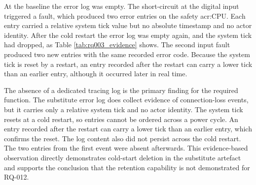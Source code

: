 At the baseline the error log was empty. The short-circuit at the digital input triggered a fault, which produced two error entries on the safety \gls{acr:CPU}. Each entry carried a relative system tick value but no absolute timestamp and no actor identity. After the cold restart the error log was empty again, and the system tick had dropped, as Table \ref{tab:rq003_evidence} shows. The second input fault produced two new entries with the same recorded error code. Because the system tick is reset by a restart, an entry recorded after the restart can carry a lower tick than an earlier entry, although it occurred later in real time.

The absence of a dedicated tracing log is the primary finding for the required function. The substitute error log does collect evidence of connection-loss events, but it carries only a relative system tick and no actor identity. The system tick resets at a cold restart, so entries cannot be ordered across a power cycle. An entry recorded after the restart can carry a lower tick than an earlier entry, which confirms the reset. The log content also did not persist across the cold restart. The two entries from the first event were absent afterwards. This evidence-based observation directly demonstrates cold-start deletion in the substitute artefact and supports the conclusion that the retention capability is not demonstrated for RQ-012.


